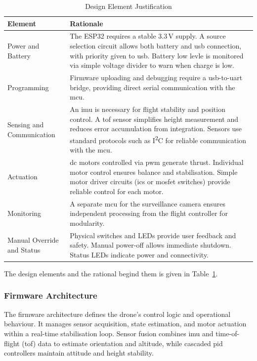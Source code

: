 \renewcommand{\arraystretch}{1.2}
\begin{table}[H]
\centering
\caption{Design Element Justification}
\label{tab:hardware-justification}
\begin{tabular}{|p{}|p{}|}
\hline
\rowcolor{gray!15}
\textbf{Element} & \textbf{Rationale} \\
\hline
Power and Battery & The ESP32 requires a stable 3.3\,V supply. A source selection circuit allows both battery and \gls{usb} connection, with priority given to \gls{usb}. Battery low levle is monitored via simple voltage divider to warn when charge is low. \\
\hline
Programming & Firmware uploading and debugging require a \gls{usb}-to-\gls{uart} bridge, providing direct serial communication with the \gls{mcu}. \\
\hline
Sensing and Communication & An \gls{imu} is necessary for flight stability and position control. A \gls{tof} sensor simplifies height measurement and reduces error accumulation from integration. Sensors use standard protocols such as I\textsuperscript{2}C for reliable communication with the \gls{mcu}. \\
\hline
Actuation & \gls{dc} motors controlled via \gls{pwm} generate thrust. Individual motor control ensures balance and stabilisation. Simple motor driver circuits (\glspl{ic} or \gls{mosfet} switches) provide reliable control for each motor. \\
\hline
Monitoring & A separate \gls{mcu} for the surveillance camera ensures independent processing from the flight controller for modularity. \\
\hline
Manual Override and Status & Physical switches and LEDs provide user feedback and safety. Manual power-off allows immediate shutdown. Status LEDs indicate power and connectivity. \\
\hline
\end{tabular}
\end{table}

The design elements and the rational begind them is given in Table~\ref{tab:hardware-justification}. 

\subsubsection{Firmware Architecture}
The firmware architecture defines the drone’s control logic and operational behaviour. It manages sensor acquisition, state estimation, and motor actuation within a real-time stabilisation loop. Sensor fusion combines \gls{imu} and time-of-flight (\gls{tof}) data to estimate orientation and altitude, while cascaded \gls{pid} controllers maintain attitude and height stability.  

